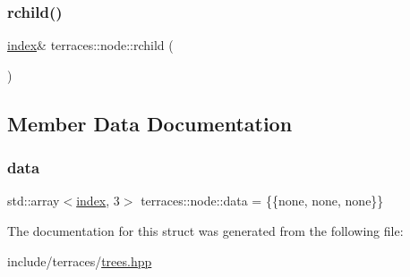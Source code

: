 \mbox{\label{structterraces_1_1node_a7d53d6f802bc0fa727c67a72033c15ad}} 
\subsubsection{\texorpdfstring{rchild()}{rchild()}\hspace{0.1cm}{\footnotesize\ttfamily [2/2]}}
{\footnotesize\ttfamily \hyperlink{namespaceterraces_adbc33ccb543d1634e96d0eb02e472c77}{index}\& terraces\+::node\+::rchild (\begin{DoxyParamCaption}{ }\end{DoxyParamCaption})\hspace{0.3cm}{\ttfamily [inline]}}



\subsection{Member Data Documentation}
\mbox{\label{structterraces_1_1node_aee217f5c4b1af9fc69f59b278f656663}} 
\subsubsection{\texorpdfstring{data}{data}}
{\footnotesize\ttfamily std\+::array$<$\hyperlink{namespaceterraces_adbc33ccb543d1634e96d0eb02e472c77}{index}, 3$>$ terraces\+::node\+::data = \{\{none, none, none\}\}}



The documentation for this struct was generated from the following file\+:\begin{DoxyCompactItemize}
\item 
include/terraces/\hyperlink{trees_8hpp}{trees.\+hpp}\end{DoxyCompactItemize}
